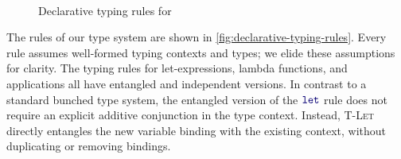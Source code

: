 \begin{figure}[h!]
{  \\[.8em]
}
  \caption{Declarative typing rules for \langname{}}
  \label{fig:declarative-typing-rules}
  \vspace*{-.1in}
\end{figure}

The rules of our type system are shown in
\autoref{fig:declarative-typing-rules}. Every rule assumes well-formed
typing contexts and types; we elide these assumptions for clarity. The
typing rules for let-expressions, lambda functions, and applications
all have entangled and independent versions. In contrast to a standard
bunched type system, the entangled version of the $\mykw{let}$ rule
does not require an explicit additive conjunction in the type
context. Instead, \textsc{T-Let} directly entangles the new variable
binding with the existing context, without duplicating or removing
bindings.

